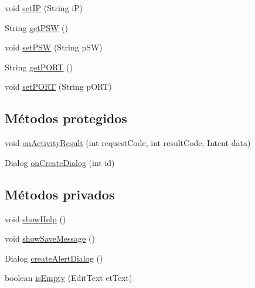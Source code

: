 \begin{DoxyCompactItemize}
\item 
void \hyperlink{classes_1_1ucm_1_1tfg_1_1controlremotolinux_1_1client_1_1controller_1_1NewConnectionActivity_a6627f1d139f4da00d76660a88ec8cd49}{set\-I\-P} (String i\-P)
\item 
String \hyperlink{classes_1_1ucm_1_1tfg_1_1controlremotolinux_1_1client_1_1controller_1_1NewConnectionActivity_ad339b3f6efdf1c548c14e74a67b53d78}{get\-P\-S\-W} ()
\item 
void \hyperlink{classes_1_1ucm_1_1tfg_1_1controlremotolinux_1_1client_1_1controller_1_1NewConnectionActivity_ab41ea6ae6959e80bea1bc523d88ecc68}{set\-P\-S\-W} (String p\-S\-W)
\item 
String \hyperlink{classes_1_1ucm_1_1tfg_1_1controlremotolinux_1_1client_1_1controller_1_1NewConnectionActivity_a38702c3658024533235e91e188f29764}{get\-P\-O\-R\-T} ()
\item 
void \hyperlink{classes_1_1ucm_1_1tfg_1_1controlremotolinux_1_1client_1_1controller_1_1NewConnectionActivity_a90e87d0692aad48bf27131a67e01de3c}{set\-P\-O\-R\-T} (String p\-O\-R\-T)
\end{DoxyCompactItemize}
\subsection*{Métodos protegidos}
\begin{DoxyCompactItemize}
\item 
void \hyperlink{classes_1_1ucm_1_1tfg_1_1controlremotolinux_1_1client_1_1controller_1_1NewConnectionActivity_adef81ccd931a706f874bc2f3cb8e2745}{on\-Activity\-Result} (int request\-Code, int result\-Code, Intent data)
\item 
Dialog \hyperlink{classes_1_1ucm_1_1tfg_1_1controlremotolinux_1_1client_1_1controller_1_1NewConnectionActivity_ac4ea366cd5d68f8795cf30ce6a8eb993}{on\-Create\-Dialog} (int id)
\end{DoxyCompactItemize}
\subsection*{Métodos privados}
\begin{DoxyCompactItemize}
\item 
void \hyperlink{classes_1_1ucm_1_1tfg_1_1controlremotolinux_1_1client_1_1controller_1_1NewConnectionActivity_a9e79359d9116c6f545cc77a70bf1867f}{show\-Help} ()
\item 
void \hyperlink{classes_1_1ucm_1_1tfg_1_1controlremotolinux_1_1client_1_1controller_1_1NewConnectionActivity_ad713d70fb1f751e174c3f10a0be9026d}{show\-Save\-Message} ()
\item 
Dialog \hyperlink{classes_1_1ucm_1_1tfg_1_1controlremotolinux_1_1client_1_1controller_1_1NewConnectionActivity_ab8b963c391882116081e3127f8e12413}{create\-Alert\-Dialog} ()
\item 
boolean \hyperlink{classes_1_1ucm_1_1tfg_1_1controlremotolinux_1_1client_1_1controller_1_1NewConnectionActivity_a53fea0f7b7035eb88667772966b12fd6}{is\-Empty} (Edit\-Text et\-Text)
\end{DoxyCompactItemize}
